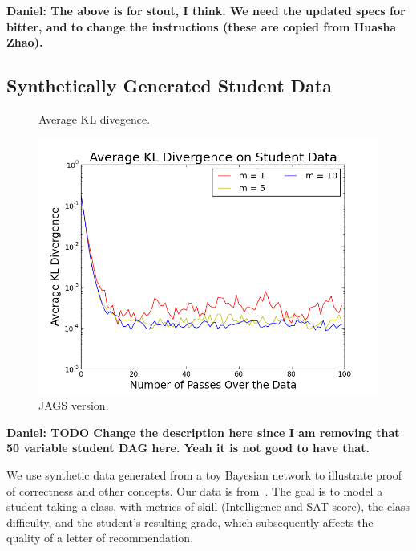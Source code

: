 \documentclass{article} %
\begin{document}
\textbf{Daniel: The above is for stout, I think. We need the updated specs for bitter, and to change
the instructions (these are copied from Huasha Zhao).}

\subsection{Synthetically Generated Student Data}\label{ssec:student_data}

\begin{figure}[t]
  \centering
  \begin{minipage}{.5\textwidth}
    \centering
    \caption{Average KL divegence.}
    \label{fig:kl_divergence}
  \end{minipage}\hfill
    \begin{minipage}{.5\textwidth}
    \centering
    \includegraphics[width=1\textwidth]{fig_kl_div_25_50_perc_jags}
    \caption{JAGS version.}
    \label{fig:kl_accuracy}
  \end{minipage}
\end{figure}

\textbf{Daniel: TODO Change the description here since I am removing that 50 variable student DAG
here. Yeah it is not good to have that.}

We use synthetic data generated from a toy Bayesian network to illustrate proof of correctness and
other concepts. Our data is from~\citet{Koller2009}. The goal is to model a student taking a class,
with metrics of skill (Intelligence and SAT score), the class difficulty, and the student's
resulting grade, which subsequently affects the quality of a letter of recommendation.
\end{document}

